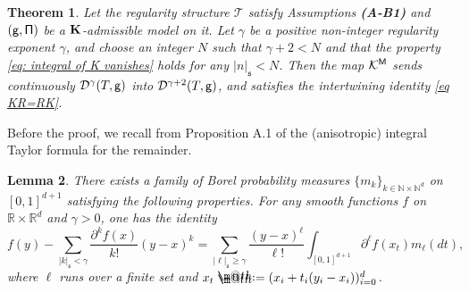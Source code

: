 \documentclass[10pt, reqno]{amsart}
\makeatletter
\numberwithin{subsection}{section}
\numberwithin{subsubsection}{subsection}
\numberwithin{equation}{section} %
\theoremstyle{mystyle}
\newtheorem{thm}{Theorem}
\newtheorem{lem}[thm]{\hspace{-0.14cm}  {Lemma} }%
\theoremstyle{mystyle2}
\theoremstyle{mystyle3}
\newcommand{\mfs}{\mathfrak{s}}
\newcommand\bbN{\mathbb{N}}
\newcommand\bbR{\mathbb{R}}
\newcommand{\mcD}{\mathcal{D}}
\newcommand{\mcK}{\mathcal{K}}
\newcommand*{\defeq}{\mathrel{\rlap{%
                     \raisebox{0.3ex}{$\m@th\cdot$}}%
                     \raisebox{-0.3ex}{$\m@th\cdot$}}%
                     =}
\makeatother
\begin{document}
\medskip

\begin{thm} \label{thm wellposedness of K}
Let the regularity structure $\mathscr{T}$ satisfy Assumptions \textbf{\textsf{(A-B1)}} and $\sf (g,\Pi)$ be a $\bf K$-admissible model on it. Let $\gamma$ be a positive non-integer regularity exponent $\gamma$, and choose an integer $N$ such that $\gamma+2<N$ and that the property \eqref{eq: integral of K vanishes} holds for any $|n|_{\mathfrak{s}}<N$. Then the map $\mcK^{\sf M}$ sends continuously $\mcD^\gamma(T,\sf g)$ into $\mcD^{\gamma+2}(T,\sf g)$, and satisfies the intertwining identity \eqref{eq KR=RK}.
\end{thm}

\medskip

Before the proof, we recall from Proposition A.1 of \cite{Hai14} the (anisotropic) integral Taylor formula for the remainder.

\medskip

\begin{lem}\label{lem:anisoTaylor}
There exists a family of Borel probability measures $\{m_k\}_{k\in\bbN\times\bbN^d}$ on $[0,1]^{d+1}$ satisfying the following properties.
For any smooth functions $f$ on $\bbR\times\bbR^d$ and $\gamma>0$, one has the identity
$$
f(y)-\sum_{|k|_\mfs<\gamma}\frac{\partial^kf(x)}{k!}(y-x)^k
=\sum_{|\ell|_\mfs\ge\gamma}\frac{(y-x)^\ell}{\ell!}\int_{[0,1]^{d+1}}\partial^\ell f(x_t)m_\ell(dt),
$$
where $\ell$ runs over a finite set and $x_t\defeq (x_i+t_i(y_i-x_i))_{i=0}^d$.
\end{lem}

\medskip
\end{document}
